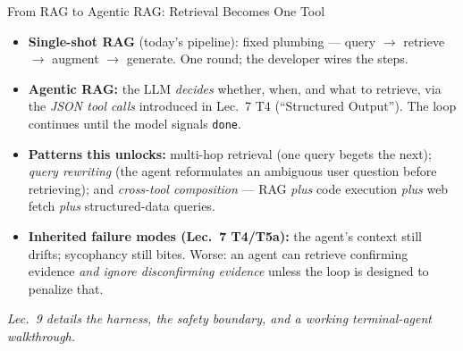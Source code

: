 \begin{frame}{From RAG to Agentic RAG: Retrieval Becomes One Tool}
\begin{itemize}\small
\item \textbf{Single-shot RAG} (today's pipeline): fixed plumbing --- query $\to$ retrieve $\to$ augment $\to$ generate. One round; the developer wires the steps.

\smallskip
\item \textbf{Agentic RAG:} the LLM \emph{decides} whether, when, and what to retrieve, via the \emph{JSON tool calls} introduced in Lec.\ 7 T4 (``Structured Output''). The loop continues until the model signals \texttt{done}.

\smallskip
\item \textbf{Patterns this unlocks:} multi-hop retrieval (one query begets the next); \emph{query rewriting} (the agent reformulates an ambiguous user question before retrieving); and \emph{cross-tool composition} --- RAG \emph{plus} code execution \emph{plus} web fetch \emph{plus} structured-data queries.

\smallskip
\item \textbf{Inherited failure modes (Lec.\ 7 T4/T5a):} the agent's context still drifts; sycophancy still bites. Worse: an agent can retrieve confirming evidence \emph{and ignore disconfirming evidence} unless the loop is designed to penalize that.
\end{itemize}

\vspace{-0.1cm}
\begin{center}
\end{center}

\vspace{-0.1cm}
\centering\textit{Lec.\ 9 details the harness, the safety boundary, and a working terminal-agent walkthrough.}
\end{frame}

